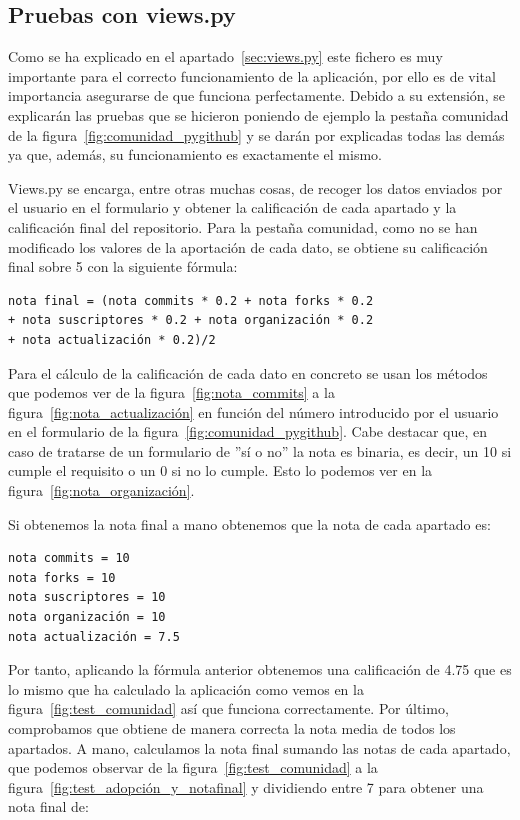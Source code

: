 \documentclass[a4paper, 12pt]{book}
\begin{document}
\subsection{Pruebas con views.py}

Como se ha explicado en el apartado~\ref{sec:views.py} este fichero es muy importante para el correcto funcionamiento de la aplicación, por ello es de vital importancia asegurarse de que funciona perfectamente. Debido a su extensión, se explicarán las pruebas que se hicieron poniendo de ejemplo la pestaña comunidad de la figura~\ref{fig:comunidad_pygithub} y se darán por explicadas todas las demás ya que, además, su funcionamiento es exactamente el mismo.

Views.py se encarga, entre otras muchas cosas, de recoger los datos enviados por el usuario en el formulario y obtener la calificación de cada apartado y la calificación final del repositorio. Para la pestaña comunidad, como no se han modificado los valores de la aportación de cada dato, se obtiene su calificación final sobre 5 con la siguiente fórmula:

\begin{verbatim}
nota final = (nota commits * 0.2 + nota forks * 0.2
+ nota suscriptores * 0.2 + nota organización * 0.2 
+ nota actualización * 0.2)/2
\end{verbatim}

Para el cálculo de la calificación de cada dato en concreto se usan los métodos que podemos ver de la figura~\ref{fig:nota_commits} a la figura~\ref{fig:nota_actualización} en función del número introducido por el usuario en el formulario de la figura~\ref{fig:comunidad_pygithub}. Cabe destacar que, en caso de tratarse de un formulario de ''sí o no'' la nota es binaria, es decir, un 10 si cumple el requisito o un 0 si no lo cumple. Esto lo podemos ver en la figura~\ref{fig:nota_organización}.

Si obtenemos la nota final a mano obtenemos que la nota de cada apartado es:

\begin{verbatim}
nota commits = 10
nota forks = 10
nota suscriptores = 10
nota organización = 10
nota actualización = 7.5
\end{verbatim}

Por tanto, aplicando la fórmula anterior obtenemos una calificación de 4.75 que es lo mismo que ha calculado la aplicación como vemos en la figura~\ref{fig:test_comunidad} así que funciona correctamente. Por último, comprobamos que obtiene de manera correcta la nota media de todos los apartados. A mano, calculamos la nota final sumando las notas de cada apartado, que podemos observar de la figura~\ref{fig:test_comunidad} a la figura~\ref{fig:test_adopción_y_notafinal} y dividiendo entre 7 para obtener una nota final de:
\end{document}
